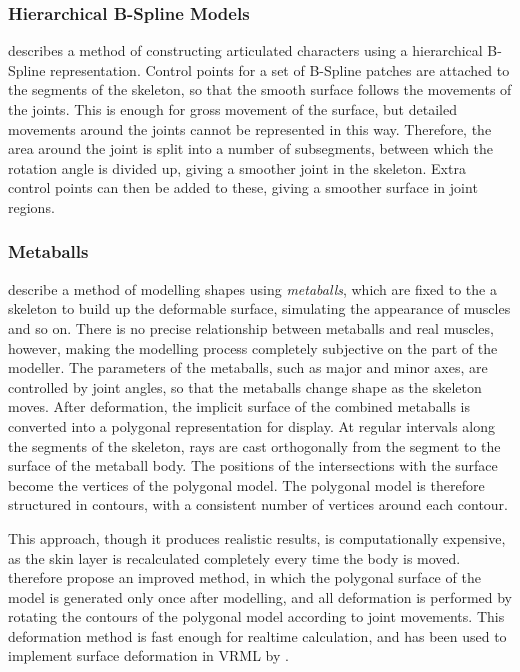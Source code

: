 \subsubsection{\label{sec:litreview:animation:geometric:bspline}Hierarchical B-Spline Models}
\citet{Forsey91} describes a method of constructing articulated characters using a hierarchical B-Spline representation. Control points for a set of B-Spline patches are attached to the segments of the skeleton, so that the smooth surface follows the movements of the joints. This is enough for gross movement of the surface, but detailed movements around the joints cannot be represented in this way. Therefore, the area around the joint is split into a number of subsegments, between which the rotation angle is divided up, giving a smoother joint in the skeleton. Extra control points can then be added to these, giving a smoother surface in joint regions.

\subsubsection{\label{sec:litreview:animation:geometric:metaballs}Metaballs}
\citet{Shen95} describe a method of modelling shapes using {\it metaballs}, which are fixed to the a skeleton to build up the deformable surface, simulating the appearance of muscles and so on. There is no precise relationship between metaballs and real muscles, however, making the modelling process completely subjective on the part of the modeller. The parameters of the metaballs, such as major and minor axes, are controlled by joint angles, so that the metaballs change shape as the skeleton moves. After deformation, the implicit surface of the combined metaballs is converted into a polygonal representation for display. At regular intervals along the segments of the skeleton, rays are cast orthogonally from the segment to the surface of the metaball body. The positions of the intersections with the surface become the vertices of the polygonal model. The polygonal model is therefore structured in contours, with a consistent number of vertices around each contour. 

This approach, though it produces realistic results, is computationally expensive, as the skin layer is recalculated completely every time the body is moved. \citet{Thalmann96} therefore propose an improved method, in which the polygonal surface of the model is generated only once after modelling, and all deformation is performed by rotating the contours of the polygonal model according to joint movements. This deformation method is fast enough for realtime calculation, and has been used to implement surface deformation in VRML by \citet{Babski99}.

